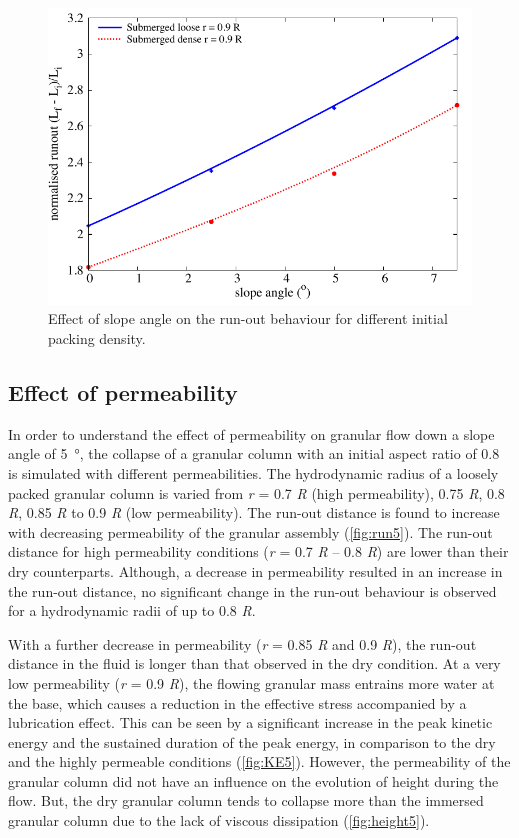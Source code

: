 \begin{figure}
\centering
\includegraphics[width=0.97\columnwidth]{slope_runout}
\caption{Effect of slope angle on the run-out behaviour for different initial 
packing density.}
\label{fig:slope_runout}
\end{figure}


\subsection{Effect of permeability}

In order to understand the effect of permeability on granular flow down a slope 
angle of \SI{5}{\degree}, the collapse of a granular column with an initial 
aspect ratio of 0.8 is simulated with different permeabilities. The 
hydrodynamic radius of a loosely packed granular column is varied from 
\textit{r} = 0.7 \textit{R} (high permeability), 0.75 \textit{R}, 0.8 
\textit{R}, 0.85 \textit{R} to 0.9 \textit{R} (low permeability). The run-out 
distance is found to increase with decreasing permeability of the granular 
assembly (\cref{fig:run5}). The run-out distance for high permeability 
conditions (\textit{r} = 0.7 \textit{R} -- 0.8 \textit{R}) are lower than their 
dry counterparts. Although, a decrease in permeability resulted in an increase 
in the run-out distance, no significant change in the run-out behaviour is 
observed for a hydrodynamic radii of up to 0.8 \textit{R}.

With a further decrease in permeability (\textit{r} = 0.85 \textit{R} and 0.9 
\textit{R}), the run-out 
distance in the fluid is longer than that observed in the dry 
condition. At a very low permeability (\textit{r} = 0.9 \textit{R}), the 
flowing granular mass
entrains more water at the base, which causes a reduction in the effective 
stress accompanied by a lubrication effect. This can be seen by a significant 
increase in the peak kinetic energy and the sustained duration of the peak 
energy, in comparison to the dry and the highly permeable conditions 
(\cref{fig:KE5}). However, the permeability of the granular column did not have 
an influence on the evolution of height during the flow. But, the dry granular 
column tends to collapse more than the immersed granular column due to the lack 
of viscous dissipation (\cref{fig:height5}).

